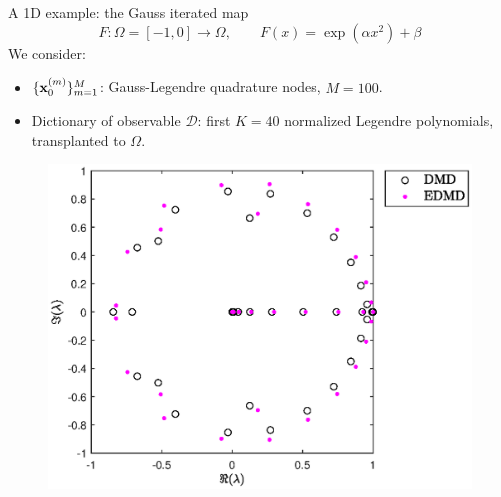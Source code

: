 \documentclass{beamer}
\begin{document}
\begin{frame}{A 1D example: the Gauss iterated map}
\begin{equation*}
    F:\Omega = [-1, 0] \to\Omega, \qquad F(x) =\exp(\alpha x^2) + \beta 
\end{equation*}
We consider:
\begin{itemize}
    \item $\{\vb{x}_0^{(m)}\}_{m = 1}^M$: Gauss-Legendre quadrature nodes, $M = 100$.
    \item Dictionary of observable $\mathcal{D}$: first $K = 40$ normalized Legendre polynomials, transplanted to $\Omega$.
\end{itemize}
\begin{figure}[h]
    \centering
    \includegraphics[width=0.55\linewidth]{../code/figures/gauss_map/presentation.eps}
\end{figure}
\end{frame}
\end{document}
